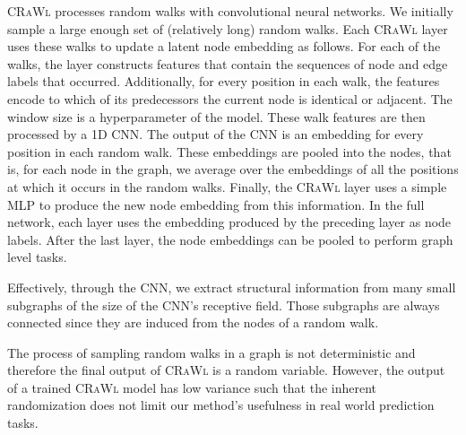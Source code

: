 \documentclass{scrartcl} \usepackage[dvipsnames]{xcolor}
\newcommand{\mrrand}[1]{\todo[color=red!40,size=\scriptsize]{\textbf{MR:} #1}}
\newcommand{\crawl}{\textsc{CRaWl}}
\begin{document}
        \begin{figure*}[t]
        \centering
        \caption{
        Example of the information flow in a \crawl{} layer for a graph with 8 nodes. 
        We sample a walk  and compute the feature matrix~ based on node embeddings  edge embeddings  and a window size of . To this matrix we apply a 1D CNN with receptive field  and pool the output into the nodes to update their embeddings.
}
        \label{fig:featurematrix}
    \end{figure*}
\crawl{} processes random walks with convolutional neural networks.
We initially sample a large enough set of (relatively long) random walks.
    Each \crawl{} layer uses these walks to update a latent node embedding as follows.
    For each of the walks, the layer constructs features that contain the sequences of node and edge labels that occurred.
Additionally, for every position in each walk, the features encode to which of its  predecessors the current node is identical or adjacent.
    The window size  is a hyperparameter of the model.
    These walk features are then processed by a 1D CNN.
    The output of the CNN is an embedding for every position in each random walk.
    These embeddings are pooled into the nodes, that is, for each node in the graph, we average over the embeddings of all the positions at which it occurs in the random walks.
    Finally, the \crawl{} layer uses a simple MLP to produce the new node embedding from this information.
    In the full network, each layer uses the embedding produced by the preceding layer as node labels.
    After the last layer, the node embeddings can be pooled to perform graph level tasks.
    
    
    
    Effectively, through the CNN, we extract structural information from many small subgraphs of the size of the CNN's receptive field.
    Those subgraphs are always connected since they are induced from the nodes of a random walk.\mrrand{das sagen wir nochmal in 3.2 am ende}

    
    The process of sampling random walks in a graph is not deterministic and therefore the final output of \crawl{} is a random variable.
    However, the output of a trained \crawl{} model has low variance such that the inherent randomization does not limit our method's usefulness in real world prediction tasks.
    
\end{document}
